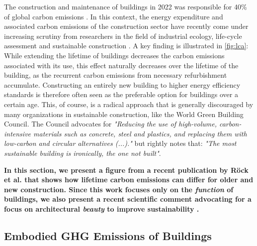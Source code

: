 \documentclass[a4paper]{article}
\begin{document}
\begin{mdframed}[linewidth=1pt, roundcorner=5pt, innerleftmargin=10pt, innerrightmargin=10pt, innertopmargin=10pt, innerbottommargin=10pt, linecolor=black, backgroundcolor=white, userdefinedwidth=\textwidth]
    The construction and maintenance of buildings in 2022 was responsible for 40\% of global carbon emissions \cite{camarasa_energy_2023}. In this context, the energy expenditure and associated carbon emissions of the construction sector have recently come under increasing scrutiny from researchers in the field of industrial ecology, life-cycle assessment and sustainable construction \cite{chau_review_2015}\cite{ortiz_sustainability_2009}. A key finding is illustrated in \cref{fig:lca}: While extending the lifetime of buildings decreases the carbon emissions associated with its use, this effect naturally decreases over the lifetime of the building, as the recurrent carbon emissions from necessary refurbishment accumulate. Constructing an entirely new building to higher energy efficiency standards is therefore often seen as the preferable option for buildings over a certain age. This, of course, is a radical approach that is generally discouraged by many organizations in sustainable construction, like the World Green Building Council. The Council advocates for \textit{"Reducing the use of high-volume, carbon-intensive materials such as concrete, steel and plastics, and replacing them with low-carbon and circular alternatives (...)."} \cite[Sec. 7.4]{noauthor_2022_2022} but rightly notes that: \textit{"The most sustainable building is ironically, the one not built"}.
    
    \textbf{In this section, we present a figure from a recent publication by Röck et al. \cite{rock_embodied_2020} that shows how lifetime carbon emissions can differ for older and new construction. Since this work focuses only on the \textit{function} of buildings, we also present a recent scientific comment advocating for a focus on architectural \textit{beauty} to improve sustainability \cite{piotrowski_focusing_2024}.}
\end{mdframed}

\subsection{Embodied GHG Emissions of Buildings}
\end{document}
